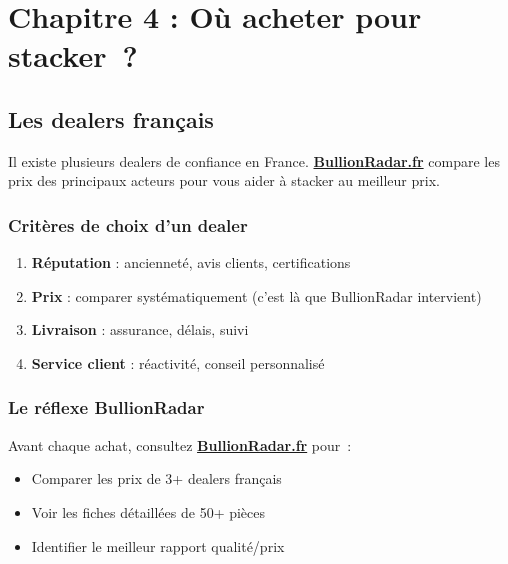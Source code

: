 \documentclass[14pt,a4paper]{extarticle}
\begin{document}
\newpage

\section{Chapitre 4 : Où acheter pour stacker~?}

\subsection{Les dealers français}

Il existe plusieurs dealers de confiance en France. \href{https://bullionradar.fr}{\textbf{BullionRadar.fr}} compare les prix des principaux acteurs pour vous aider à stacker au meilleur prix.

\subsubsection{Critères de choix d'un dealer}

\begin{enumerate}
  \item \textbf{Réputation} : ancienneté, avis clients, certifications
  \item \textbf{Prix} : comparer systématiquement (c'est là que BullionRadar intervient)
  \item \textbf{Livraison} : assurance, délais, suivi
  \item \textbf{Service client} : réactivité, conseil personnalisé
\end{enumerate}

\subsubsection{Le réflexe BullionRadar}

Avant chaque achat, consultez \href{https://bullionradar.fr}{\textbf{BullionRadar.fr}} pour~:
\begin{itemize}
  \item Comparer les prix de 3+ dealers français
  \item Voir les fiches détaillées de 50+ pièces
  \item Identifier le meilleur rapport qualité/prix
\end{itemize}

\newpage
\end{document}
